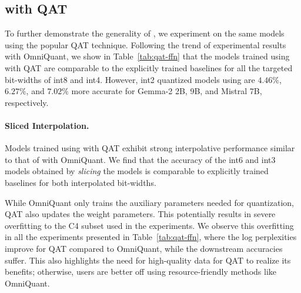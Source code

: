 \subsection{\alg with QAT}
\label{sec:exp-qat}
To further demonstrate the generality of \alg, we experiment on the same models using the popular QAT technique. Following the trend of experimental results with OmniQuant, we show in Table~\ref{tab:qat-ffn} that the models trained using \alg with QAT are comparable to the explicitly trained baselines for all the targeted bit-widths of int8 and int4. However, int2 quantized models using \alg are $4.46\%$, $6.27\%$, and $7.02\%$ more accurate for Gemma-2 2B, 9B, and Mistral 7B, respectively.

\vspace{-2mm}
\paragraph{Sliced Interpolation.}
Models trained using \alg with QAT exhibit strong interpolative performance similar to that of \alg with OmniQuant. We find that the accuracy of the int6 and int3 models obtained by \textit{slicing} the \alg models is comparable to explicitly trained baselines for both interpolated bit-widths.

While OmniQuant only trains the auxiliary parameters needed for quantization, QAT also updates the weight parameters. This potentially results in severe overfitting to the C4 subset used in the experiments. We observe this overfitting in all the experiments presented in Table~\ref{tab:qat-ffn}, where the log perplexities improve for QAT compared to OmniQuant, while the downstream accuracies suffer. This also highlights the need for high-quality data for QAT to realize its benefits; otherwise, users are better off using resource-friendly methods like OmniQuant.




